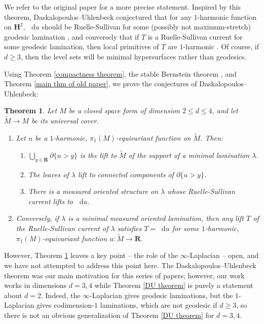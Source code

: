 \documentclass[reqno,11pt]{amsart}
\newcommand{\RR}{\mathbf{R}}
\newcommand{\Hyp}{\mathbf H}
\newcommand*\dif{\mathop{}\!\mathrm{d}}
\newtheorem{theorem}{Theorem}[section]
\theoremstyle{definition}
\numberwithin{equation}{section}
\begin{document}
We refer to the original paper \cite{daskalopoulos2020transverse} for a more precise statement.
Inspired by this theorem, Daskalopoulos--Uhlenbeck conjectured that for any $1$-harmonic function on $\Hyp^2$, $\dif u$ should be Ruelle-Sullivan for some (possibly not maximum-stretch) geodesic lamination \cite[Problem 9.4]{daskalopoulos2020transverse}, and conversely that if $T$ is a Ruelle-Sullivan current for some geodesic lamination, then local primitives of $T$ are $1$-harmonic \cite[Conjecture 9.5]{daskalopoulos2020transverse}.
Of course, if $d \geq 3$, then the level sets will be minimal hypersurfaces rather than geodesics.

Using Theorem \ref{compactness theorem}, the stable Bernstein theorem \cite{Schoen2016, Chodosh2021}, and Theorem \ref{main thm of old paper}, we prove the conjectures of Daskalopoulos--Uhlenbeck:

\begin{theorem}\label{main thm}
Let $M$ be a closed space form of dimension $2 \leq d \leq 4$, and let $\tilde M \to M$ be its universal cover.
\begin{enumerate}
\item Let $u$ be a $1$-harmonic, $\pi_1(M)$-equivariant function on $\tilde M$.
Then:
\begin{enumerate}
\item $\bigcup_{y \in \RR} \partial \{u > y\}$ is the lift to $\tilde M$ of the support of a minimal lamination $\lambda$.
\item The leaves of $\lambda$ lift to connected components of $\partial \{u > y\}$.
\item There is a measured oriented structure on $\lambda$ whose Ruelle-Sullivan current lifts to $\dif u$.
\end{enumerate}
\item Conversely, if $\lambda$ is a minimal measured oriented lamination, then any lift $T$ of the Ruelle-Sullivan current of $\lambda$ satisfies $T = \dif u$ for some $1$-harmonic, $\pi_1(M)$-equivariant function $u: \tilde M \to \RR$.
\end{enumerate}
\end{theorem}

However, Theorem \ref{main thm} leaves a key point -- the role of the $\infty$-Laplacian -- open, and we have not attempted to address this point here.
The Daskalopoulos--Uhlenbeck theorem was our main motivation for this series of papers; however, our work works in dimensions $d = 3, 4$ while Theorem \ref{DU theorem} is purely a statement about $d = 2$.
Indeed, the $\infty$-Laplacian gives geodesic laminations, but the $1$-Laplacian gives codimension-$1$ laminations, which are not geodesic if $d \geq 3$, so there is not an obvious generalization of Theorem \ref{DU theorem} for $d = 3, 4$.
\end{document}
